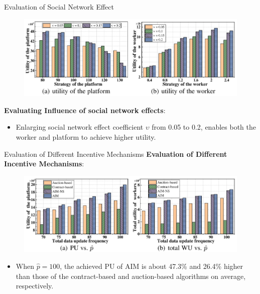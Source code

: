 \documentclass[aspectratio=169,xcolor=dvipsnames]{beamer}
\begin{document}
\begin{frame}[fragile]{Evaluation of Social Network Effect}
    \footnotesize %
    \begin{figure}
        \centering
        \includegraphics[width=0.8\linewidth]{Social Network Effects.png}
    \end{figure}    
    \textbf{Evaluating Influence of social network effects}: 
    
    \begin{itemize}
        \item Enlarging social network effect coefficient \(\upsilon\) from 0.05 to 0.2, enables both the worker and platform to achieve higher utility.
    \end{itemize}
\end{frame}

\begin{frame}[fragile]{Evaluation of Different Incentive Mechanisms}
    \footnotesize %
    \textbf{Evaluation of Different Incentive Mechanisms}: 
\begin{figure}
        \centering
        \includegraphics[width=0.8\linewidth]{different_incentive_mechanisms.png}
    \end{figure}
        
    \begin{itemize}
        \item When $\hat{p} = 100$, the achieved PU of AIM is about 47.3\% and 26.4\% higher than those of the contract-based and auction-based algorithms on average, respectively.
    \end{itemize}
\end{frame}
\end{document}
